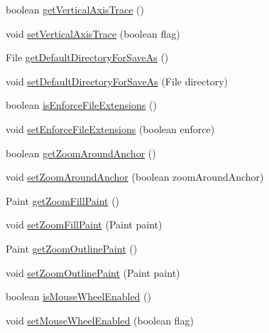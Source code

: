 \begin{DoxyCompactItemize}
\item 
boolean \mbox{\hyperlink{classorg_1_1jfree_1_1chart_1_1_chart_panel_afda8320af8c289e64bc25d2b9c3ff6d3}{get\+Vertical\+Axis\+Trace}} ()
\item 
void \mbox{\hyperlink{classorg_1_1jfree_1_1chart_1_1_chart_panel_a1425e60bacadbe242d75b7880da29994}{set\+Vertical\+Axis\+Trace}} (boolean flag)
\item 
File \mbox{\hyperlink{classorg_1_1jfree_1_1chart_1_1_chart_panel_a577d69ef73aea1e3ecdeb077ad76ea0e}{get\+Default\+Directory\+For\+Save\+As}} ()
\item 
void \mbox{\hyperlink{classorg_1_1jfree_1_1chart_1_1_chart_panel_ac522702a7beadb12aaa4b53ec348df0c}{set\+Default\+Directory\+For\+Save\+As}} (File directory)
\item 
boolean \mbox{\hyperlink{classorg_1_1jfree_1_1chart_1_1_chart_panel_aaebe30d98d0d14bcc5ef0f2015fd34d5}{is\+Enforce\+File\+Extensions}} ()
\item 
void \mbox{\hyperlink{classorg_1_1jfree_1_1chart_1_1_chart_panel_abb236dd517452e470fafc8b91923fde2}{set\+Enforce\+File\+Extensions}} (boolean enforce)
\item 
boolean \mbox{\hyperlink{classorg_1_1jfree_1_1chart_1_1_chart_panel_a6065bf6f61e0af4aafccc420853332a6}{get\+Zoom\+Around\+Anchor}} ()
\item 
void \mbox{\hyperlink{classorg_1_1jfree_1_1chart_1_1_chart_panel_a89fcf9fe09158f887a38f2cf4af15b42}{set\+Zoom\+Around\+Anchor}} (boolean zoom\+Around\+Anchor)
\item 
Paint \mbox{\hyperlink{classorg_1_1jfree_1_1chart_1_1_chart_panel_aa67bc49f93e13a11fa4be9fcff4bead8}{get\+Zoom\+Fill\+Paint}} ()
\item 
void \mbox{\hyperlink{classorg_1_1jfree_1_1chart_1_1_chart_panel_aacca6fbee6fa44be58e9b580b11c65f7}{set\+Zoom\+Fill\+Paint}} (Paint paint)
\item 
Paint \mbox{\hyperlink{classorg_1_1jfree_1_1chart_1_1_chart_panel_a2db2a730b563e5e3145d11985beb23df}{get\+Zoom\+Outline\+Paint}} ()
\item 
void \mbox{\hyperlink{classorg_1_1jfree_1_1chart_1_1_chart_panel_a5b5c5e86abd33a1ac75f62b786f41d6a}{set\+Zoom\+Outline\+Paint}} (Paint paint)
\item 
boolean \mbox{\hyperlink{classorg_1_1jfree_1_1chart_1_1_chart_panel_a1a3a6c53775707054fd3f3c934804d32}{is\+Mouse\+Wheel\+Enabled}} ()
\item 
void \mbox{\hyperlink{classorg_1_1jfree_1_1chart_1_1_chart_panel_a93dfdfc1e78f4e2153828ea0c7730d4f}{set\+Mouse\+Wheel\+Enabled}} (boolean flag)

\end{DoxyCompactItemize}
